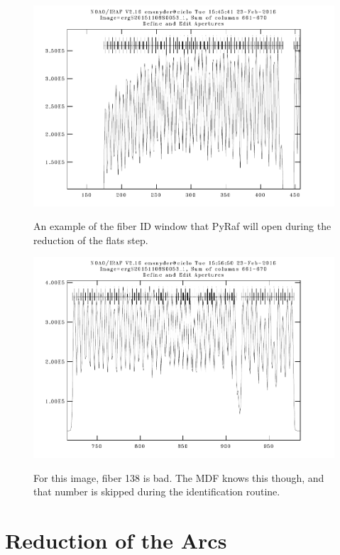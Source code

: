 \documentclass[12pt]{report}
\begin{document}
\begin{figure}[h]
\centering
\includegraphics{apertures2}
\label{fig:ap2}
\caption[Zoomed In Fiber ID Example]{An example of the fiber ID window that PyRaf will open during the reduction of the flats step.}
\end{figure}

\begin{figure}[h]
\centering
\includegraphics{badfiber}
\label{fig:bad}
\caption[Example Image of a Bad Fiber]{For this image, fiber 138 is bad. The MDF knows this though, and that number is skipped during the identification routine.}
\end{figure}


\section{Reduction of the Arcs}
\end{document}
